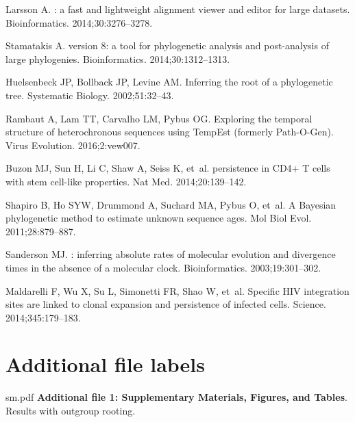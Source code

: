 \documentclass{bmcart}
\begin{document}
\begin{backmatter}
\begin{thebibliography}{10}
Larsson A.
: a fast and lightweight alignment viewer and editor for
  large datasets.
\newblock Bioinformatics. 2014;\hspace{0pt}30:3276--3278.

Stamatakis A.
 version 8: a tool for phylogenetic analysis and post-analysis
  of large phylogenies.
\newblock Bioinformatics. 2014;\hspace{0pt}30:1312--1313.

Huelsenbeck JP, Bollback JP, Levine AM.
\newblock Inferring the root of a phylogenetic tree.
\newblock Systematic Biology. 2002;\hspace{0pt}51:32--43.

Rambaut A, Lam TT, Carvalho LM, Pybus OG.
\newblock Exploring the temporal structure of heterochronous sequences using
  {TempEst} (formerly {Path-O-Gen}).
\newblock Virus Evolution. 2016;\hspace{0pt}2:vew007.

Buzon MJ, Sun H, Li C, Shaw A, Seiss K, et~al.
 persistence in {CD4+} {T} cells with stem cell-like
  properties.
\newblock Nat Med. 2014;\hspace{0pt}20:139--142.

Shapiro B, Ho SYW, Drummond A, Suchard MA, Pybus O, et~al.
\newblock A {Bayesian} phylogenetic method to estimate unknown sequence ages.
\newblock Mol Biol Evol. 2011;\hspace{0pt}28:879--887.

Sanderson MJ.
: inferring absolute rates of molecular evolution and divergence
  times in the absence of a molecular clock.
\newblock Bioinformatics. 2003;\hspace{0pt}19:301--302.

Maldarelli F, Wu X, Su L, Simonetti FR, Shao W, et~al.
\newblock Specific {HIV} integration sites are linked to clonal expansion and
  persistence of infected cells.
\newblock Science. 2014;\hspace{0pt}345:179--183.

\end{thebibliography}


\section*{Additional file labels}
sm.pdf {\bf Additional file 1: Supplementary Materials, Figures, and Tables}. Results with outgroup rooting.


\end{backmatter}
\end{document}
